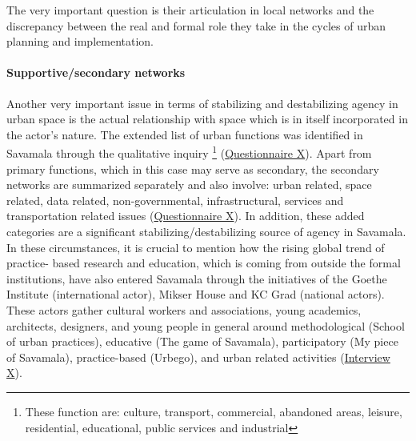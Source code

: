 \documentclass[11pt]{report}
\begin{document}
{{{{The very important question is their articulation in local networks and the discrepancy between the real and formal role they take in the cycles of urban planning and implementation.

\paragraph{Supportive/secondary networks}

Another very important issue in terms of stabilizing and destabilizing agency in urban space is the actual relationship with space which is in itself incorporated in the actor's nature.
The extended list of urban functions was identified in Savamala through the qualitative inquiry
\footnote{These function are: culture, transport, commercial, abandoned areas, leisure, residential, educational, public services and industrial}
(\href{Questionnaire Students Savamala}{Questionnaire X}).
Apart from primary functions, which in this case may serve as secondary,  the secondary networks are summarized separately and also involve: urban related, space related, data related, non-governmental, infrastructural, services and transportation related issues (\href{Questionnaire Students Savamala}{Questionnaire X}).
In addition, these added categories are a significant stabilizing/destabilizing  source  of  agency  in  Savamala.
\\

In these circumstances, it is crucial to mention how the rising global trend of practice- based research and education, which is coming from outside the formal institutions, have also entered Savamala through the initiatives of the Goethe Institute (international actor), Mikser House and KC Grad (national actors). These actors gather cultural workers and associations, young academics, architects, designers, and young people in general around methodological (School of urban practices), educative (The game of Savamala), participatory (My piece of Savamala), practice-based (Urbego), and urban related activities (\href{InterviewX}{Interview X}).
\\

}}}}
\end{document}
